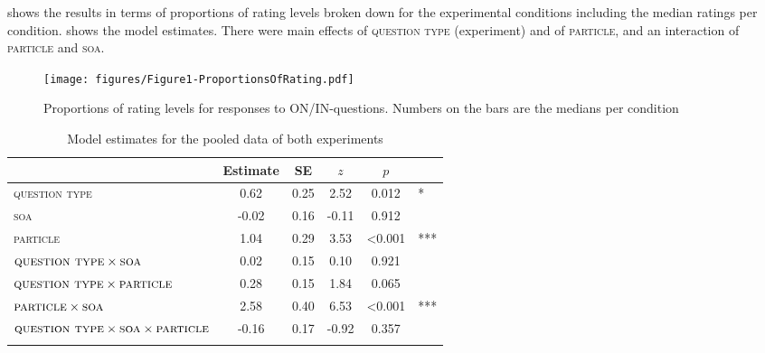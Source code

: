 \documentclass[output=paper,colorlinks,citecolor=brown]{langscibook}
\begin{document}
 shows the results in terms of proportions of rating levels broken down for the experimental conditions including the median ratings per condition.  shows the model estimates. There were main effects of \textsc{question type} (experiment) and of \textsc{particle}, and an interaction of \textsc{particle} and \textsc{soa}.


\begin{figure}
\texttt{[image: figures/Figure1-ProportionsOfRating.pdf]}
\caption{Proportions of rating levels for responses to ON/IN-questions. Numbers on the bars are the medians per condition}
\label{geist-repp:fig:proportionsOfRating}
\end{figure}

\begin{table}
\caption{Model estimates for the pooled data of both experiments}
\label{geist-repp:tab:model-estimates-pooled-data}
 \begin{tabular}{l  S[table-format=-1.2] S[table-format=1.2] S[table-format=-1.2] S[table-format=<1.3]@{}l}
  \lsptoprule
                                                                             & {Estimate} & {SE}  & {$z$} & {$p$} & \\
     \midrule
          \textsc{question type}                                             &   0.62  &  0.25  &   2.52  & 0.012&*\\
          \textsc{soa}                                                       &  -0.02  &  0.16  & -0.11 & 0.912\\
          \textsc{particle}                                                  &  1.04   &  0.29  & 3.53 & <0.001&***\\
          $\textsc{question type}\times\textsc{soa}$                         &  0.02   &  0.15  & 0.10 & 0.921 \\
          $\textsc{question type}\times\textsc{particle}$                    &  0.28   &  0.15  & 1.84 & 0.065\\
          $\textsc{particle}\times\textsc{soa}$                              &  2.58   &  0.40  & 6.53 & <0.001&***\\
          $\textsc{question type}\times\textsc{soa}\times\textsc{particle}$  &  -0.16  &  0.17  & -0.92 & 0.357\\
  \lspbottomrule
 \end{tabular}
\end{table}
\end{document}
